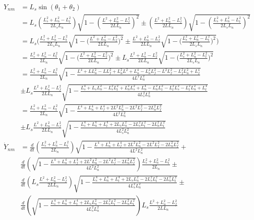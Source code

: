 \documentclass[11pt, landscape]{article}
\begin{document}
\begin{align}
  Y_{nm} &= L_s\sin(\theta_1 + \theta_2)\\
  &= L_s\left(\frac{L_{s}^2+L_{n}^2-L_{t}^2}{2L_{s}L_{n}}\right)\sqrt{1-\left(\frac{L^2+L_{n}^2-L_{f}^2}{2LL_{n}}\right)^2} \pm \left(\frac{L^2+L_{n}^2-L_{f}^2}{2LL_{n}}\right)\sqrt{1-\left(\frac{L_{s}^2+L_{n}^2-L_{t}^2}{2L_{s}L_{n}}\right)^2}\\
  &= L_{s}\Bigg(\frac{L_{s}^2+L_{n}^2-L_{t}^2}{2L_{s}L_{n}}\sqrt{1-\bigg(\frac{L^2+L_{n}^2-L_{f}^2}{2LL_{n}}\bigg)^2} \pm \frac{L^2+L_{n}^2-L_{f}^2}{2LL_{n}}\sqrt{1-\bigg(\frac{L_{s}^2+L_{n}^2-L_{t}^2}{2L_{s}L_{n}}\bigg)^2} \Bigg)\\
  &= \frac{L_{s}^2+L_{n}^2-L_{t}^2}{2L_{n}}\sqrt{1-\bigg(\frac{L^2+L_{n}^2-L_{f}^2}{2LL_{n}}\bigg)^2} \pm L_s\frac{L^2+L_{n}^2-L_{f}^2}{2LL_{n}}\sqrt{1-\bigg(\frac{L_{s}^2+L_{n}^2-L_{t}^2}{2L_{s}L_{n}}\bigg)^2}\\
  &= \frac{L_{s}^2+L_{n}^2-L_{t}^2}{2L_{n}}\sqrt{1-\frac{L^4 + LL_n^2 - LL_f^2 + L_n^2L^2 + L_n^4 - L_n^2L_f^2 - L^2L_f^2 - L_f^2L_n^2 + L_f^4}{4L^2L_n^2}} \\&\pm L_s\frac{L^2+L_{n}^2-L_{f}^2}{2LL_{n}}\sqrt{1-\frac{L_s^4 + L_sL_n^2 - L_s^2L_t^2 + L_n^2L_s^2 + L_n^4 - L_n^2L_t^2 - L_t^2L_s^2 - L_t^2L_n^2 + L_t^4}{4L_s^2L_n^2}}\\
  &= \frac{L_{s}^2+L_{n}^2-L_{t}^2}{2L_{n}}\sqrt{1-\frac{L^4 + L_n^4 + L_f^4 + 2L^2L_n^2 - 2L^2L_f^2 - 2L_n^2L_f^2}{4L^2L_n^2}} \\&\pm L_s\frac{L^2+L_{n}^2-L_{f}^2}{2LL_{n}}\sqrt{1-\frac{L_s^4 + L_n^4 + L_t^4 + 2L_sL_n^2 - 2L_s^2L_t^2 - 2L_n^2L_t^2}{4L_s^2L_n^2}}\\
  \dot{Y}_{nm} &=
  \frac{d}{dt}\left(\frac{L_{s}^2+L_{n}^2-L_{t}^2}{2L_{n}}\right)\sqrt{1-\frac{L^4 + L_n^4 + L_f^4 + 2L^2L_n^2 - 2L^2L_f^2 - 2L_n^2L_f^2}{4L^2L_n^2}} +\\
  &\frac{d}{dt}\left(\sqrt{1-\frac{L^4 + L_n^4 + L_f^4 + 2L^2L_n^2 - 2L^2L_f^2 - 2L_n^2L_f^2}{4L^2L_n^2}}\right)\frac{L_{s}^2+L_{n}^2-L_{t}^2}{2L_{n}} \pm\\
  &\frac{d}{dt}\left(L_s\frac{L^2+L_{n}^2-L_{f}^2}{2LL_{n}}\right)\sqrt{1-\frac{L_s^4 + L_n^4 + L_t^4 + 2L_sL_n^2 - 2L_s^2L_t^2 - 2L_n^2L_t^2}{4L_s^2L_n^2}} \pm\\
  &\frac{d}{dt}\left(\sqrt{1-\frac{L_s^4 + L_n^4 + L_t^4 + 2L_sL_n^2 - 2L_s^2L_t^2 - 2L_n^2L_t^2}{4L_s^2L_n^2}}\right)L_s\frac{L^2+L_{n}^2-L_{f}^2}{2LL_{n}}\\
\end{align}
\end{document}
